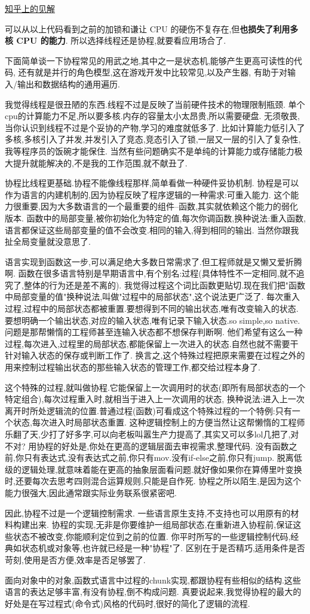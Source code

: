 \href{http://www.zhihu.com/question/20511233}{知乎上的见解}

可以从以上代码看到之前的加锁和谦让 CPU 的硬伤不复存在,但\textbf{也损失了利用多核 CPU 的能力}. 所以选择线程还是协程,就要看应用场合了.

下面简单谈一下协程常见的用武之地,其中之一是状态机,能够产生更高可读性的代码,
还有就是并行的角色模型,这在游戏开发中比较常见,以及产生器, 有助于对输入/输出和数据结构的通用遍历.

我觉得线程是很丑陋的东西.线程不过是反映了当前硬件技术的物理限制瓶颈.
单个cpu的计算能力不足,所以要多核.内存的容量太小太昂贵,所以需要硬盘.
无须敬畏,当你认识到线程不过是个妥协的产物,学习的难度就低多了.
比如计算能力低引入了多核,多核引入了并发,并发引入了竞态,竞态引入了锁,一层又一层的引入了复杂性,我等程序员的饭碗才能保住.
当然有些问题确实不是单纯的计算能力或存储能力极大提升就能解决的,不是我的工作范围,就不献丑了.

协程比线程更基础.协程不能像线程那样,简单看做一种硬件妥协机制.
协程是可以作为语言的内建机制的,因为协程反映了程序逻辑的一种需求:可重入能力.
这个能力很重要,因为大多数语言的一个最重要的组件--函数,其实就依赖这个能力的弱化版本.
函数中的局部变量,被你初始化为特定的值,每次你调函数,换种说法:重入函数,语言都保证这些局部变量的值不会改变.相同的输入,得到相同的输出.
当然你跟我扯全局变量就没意思了.

语言实现到函数这一步,可以满足绝大多数日常需求了.但工程师就是又懒又爱折腾啊.
函数在很多语言特别是早期语言中,有个别名:过程(具体特性不一定相同,就不追究了,整体的行为还是差不离的).
我觉得过程这个词比函数更贴切.现在我们把"函数中局部变量的值"换种说法,叫做"过程中的局部状态",这个说法更广泛了.
每次重入过程,过程中的局部状态都被重置.要想得到不同的输出状态,唯有改变输入的状态.
要想明确一个输出状态,对应的输入状态,唯有记录下输入状态.so simple,so native.
问题是那帮懒惰的工程师甚至连输入状态都不想保存判断啊.
他们希望有这么一种过程,每次进入,过程里的局部状态,都能保留上一次进入的状态.自然也就不需要干针对输入状态的保存或判断工作了.
换言之,这个特殊过程把原来需要在过程之外的用来控制过程输出状态的那些输入状态的管理工作,都交给过程本身了.

这个特殊的过程,就叫做协程.它能保留上一次调用时的状态(即所有局部状态的一个特定组合),每次过程重入时,就相当于进入上一次调用的状态,
换种说法:进入上一次离开时所处逻辑流的位置.普通过程(函数)可看成这个特殊过程的一个特例:只有一个状态,每次进入时局部状态重置.
这种逻辑控制上的方便当然让这帮懒惰的工程师乐翻了天,少打了好多字,可以向老板叫嚣生产力提高了,其实又可以多lol几把了,对不对?
用协程的好处是,你处在更高的逻辑层面去审视需求,整理代码.
没有函数之前,你只有表达式,没有表达式之前,你只有mov.没有if-else之前,你只有jump.
脱离低级的逻辑处理,就意味着能在更高的抽象层面看问题.就好像如果你在算傅里叶变换时,还要每次去思考四则混合运算规则,只能是自作死.
协程之所以陌生,是因为这个能力很强大,因此通常跟实际业务联系很紧密吧.

因此,协程不过是一个逻辑控制需求.
一些语言原生支持,不支持也可以用原有的材料构建出来.
协程的实现,无非是你要维护一组局部状态,在重新进入协程前,保证这些状态不被改变,你能顺利定位到之前的位置.
你平时所写的一些逻辑控制代码,经典如状态机或对象等,也许就已经是一种"协程"了.
区别在于是否精巧,适用条件是否苛刻,使用是否方便,效率是否足够罢了.

面向对象中的对象,函数式语言中过程的chunk实现,都跟协程有些相似的结构.这些语言的表达足够丰富,有没有协程,倒不构成问题.
真要说起来,我觉得协程的最大的好处是在写过程式(命令式)风格的代码时,很好的简化了逻辑的流程.


